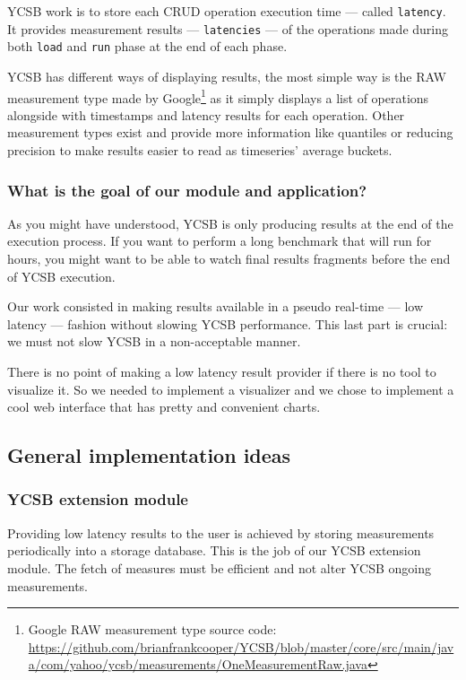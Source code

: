 \documentclass[a4paper,11pt]{report}
\begin{document}
YCSB work is to store each CRUD operation execution time --- called \texttt{latency}. It provides measurement results --- \texttt{latencies} --- of the operations made during both \texttt{load} and \texttt{run} phase at the end of each phase.

YCSB has different ways of displaying results, the most simple way is the RAW measurement type made by Google\footnote{Google RAW measurement type source code: \url{https://github.com/brianfrankcooper/YCSB/blob/master/core/src/main/java/com/yahoo/ycsb/measurements/OneMeasurementRaw.java}} as it simply displays a list of operations alongside with timestamps and latency results for each operation. Other measurement types exist and provide more information like quantiles or reducing precision to make results easier to read as timeseries' average buckets.

\subsubsection{What is the goal of our module and application?}

As you might have understood, YCSB is only producing results at the end of the execution process. If you want to perform a long benchmark that will run for hours, you might want to be able to watch final results fragments before the end of YCSB execution.

\bigskip

Our work consisted in making results available in a pseudo real-time --- low latency --- fashion without slowing YCSB performance. This last part is crucial: we must not slow YCSB in a non-acceptable manner.

There is no point of making a low latency result provider if there is no tool to visualize it. So we needed to implement a visualizer and we chose to implement a cool web interface that has pretty and convenient charts.

\subsection{General implementation ideas}

\subsubsection{YCSB extension module}

Providing low latency results to the user is achieved by storing measurements periodically into a storage database. This is the job of our YCSB extension module. The fetch of measures must be efficient and not alter YCSB ongoing measurements.
\end{document}
